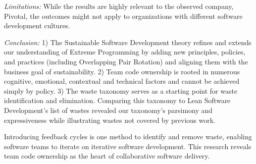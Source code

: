 \documentclass[oneside,letterpaper]{memoir}
\begin{document}
\textit{Limitations:} While the results are highly relevant to the observed company, Pivotal, the outcomes might not apply to organizations with different software development cultures.

\textit{Conclusion:} 1) The Sustainable Software Development theory refines and extends our understanding of Extreme Programming by adding new principles, policies, and practices (including Overlapping Pair Rotation) and aligning them with the business goal of sustainability. 2) Team code ownership is rooted in numerous cognitive, emotional, contextual and technical factors and cannot be achieved simply by policy. 3) The waste taxonomy serves as a starting point for waste identification and elimination. Comparing this taxonomy to Lean Software Development’s list of wastes revealed our taxonomy’s parsimony and expressiveness while illustrating wastes not covered by previous work. 

Introducing feedback cycles is one method to identify and remove waste, enabling software teams to iterate on iterative software development.  This research reveals team code ownership as the heart of collaborative software delivery. 




\end{document}
